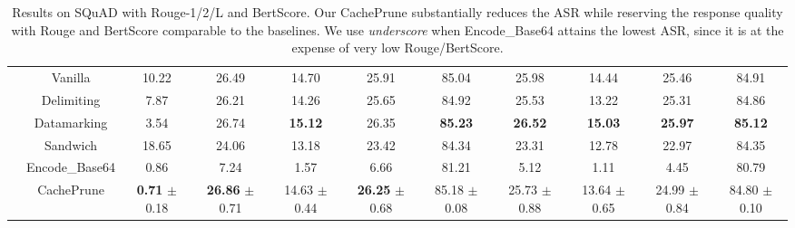 \documentclass[11pt]{article}
\begin{document}
\begin{table}[t!]
\begin{minipage}[b]{0.95\linewidth}
{\begin{tabular}{c|c|c|c|c|c|c|c|c|c|c}
      & Vanilla & 10.22 & 26.49 & 14.70 & 25.91 & 85.04 & 25.98 & 14.44 & 25.46 & 84.91 \\ 
      & Delimiting & 7.87 & 26.21 & 14.26 & 25.65 & 84.92 & 25.53 & 13.22 & 25.31 & 84.86 \\ 
      & Datamarking & 3.54 & 26.74 & \textbf{15.12} & 26.35 & \textbf{85.23} & \textbf{26.52} & \textbf{15.03} & \textbf{25.97} & \textbf{85.12} \\ 
      & Sandwich & 18.65 & 24.06 & 13.18 & 23.42 & 84.34 & 23.31 & 12.78 & 22.97 & 84.35 \\ 
      & Encode\_Base64 & 0.86 & 7.24 & 1.57 & 6.66 & 81.21 & 5.12 & 1.11 & 4.45 & 80.79 \\ 
      & CachePrune & \textbf{0.71} $\pm$ 0.18 & \textbf{26.86} $\pm$ 0.71 & 14.63 $\pm$ 0.44 & \textbf{26.25} $\pm$ 0.68 & 85.18 $\pm$ 0.08 & 25.73 $\pm$ 0.88 & 13.64 $\pm$ 0.65 & 24.99 $\pm$ 0.84 & 84.80 $\pm$ 0.10 \\ 
    \bottomrule[1.5pt]

    \end{tabular}}
    \caption{Results on SQuAD with Rouge-1/2/L and BertScore. Our CachePrune substantially reduces the ASR while reserving the response quality with Rouge and BertScore comparable to the baselines. We use \textit{underscore} when Encode\_Base64 attains the lowest ASR, since it is at the expense of very low Rouge/BertScore.}
    \label{tb:squad_only}
    \vspace{-2mm}
    \end{minipage}
\end{table}
\end{document}
